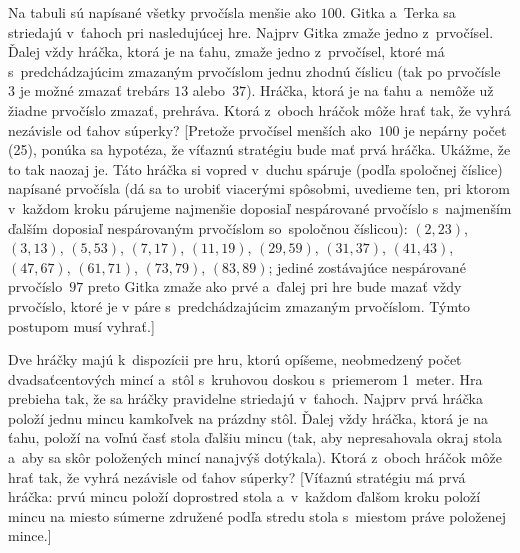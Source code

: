 {Na tabuli sú napísané všetky prvočísla menšie ako $100$.
Gitka a~Terka sa striedajú v~ťahoch pri nasledujúcej hre. Najprv
Gitka zmaže jedno z~prvočísel. Ďalej vždy hráčka, ktorá
je na ťahu, zmaže jedno z~prvočísel, ktoré má s~predchádzajúcim
zmazaným prvočíslom jednu zhodnú číslicu (tak po prvočísle~$3$ je možné zmazať
trebárs $13$ alebo~$37$).
Hráčka, ktorá je na ťahu a~nemôže už žiadne prvočíslo zmazať,
prehráva. Ktorá z~oboch hráčok môže hrať tak, že
vyhrá nezávisle od ťahov súperky? [Pretože prvočísel
menších ako~$100$ je nepárny počet (25), ponúka sa hypotéza, že
víťaznú stratégiu bude mať prvá hráčka. Ukážme, že to tak
naozaj je. Táto hráčka si vopred v~duchu spáruje (podľa spoločnej
číslice) napísané prvočísla
(dá sa to urobiť viacerými spôsobmi, uvedieme ten, pri ktorom v~každom kroku
párujeme najmenšie doposiaľ nespárované prvočíslo s~najmenším ďalším
doposiaľ nespárovaným prvočíslom so~spoločnou číslicou):
$(2,23)$, $(3,13)$, $(5,53)$,
$(7,17)$, $(11,19)$, $(29,59)$, $(31,37)$, $(41,43)$, $(47,67)$,
$(61,71)$, $(73,79)$, $(83,89)$; jediné zostávajúce nespárované
prvočíslo~$97$ preto Gitka zmaže ako prvé a~ďalej pri hre
bude mazať vždy prvočíslo, ktoré je v páre
s~predchádzajúcim zmazaným prvočíslom. Týmto postupom musí vyhrať.]

Dve hráčky majú k~dispozícii pre hru, ktorú opíšeme,
neobmedzený počet dvadsaťcentových mincí a~stôl s~kruhovou doskou s~priemerom 1~meter.
Hra prebieha tak, že sa hráčky pravidelne striedajú v~ťahoch.
Najprv prvá hráčka položí jednu mincu kamkoľvek na prázdny stôl.
Ďalej vždy hráčka, ktorá je na ťahu,
položí na voľnú časť stola ďalšiu mincu (tak, aby nepresahovala
okraj stola a~aby sa skôr položených mincí nanajvýš dotýkala).
Ktorá z~oboch hráčok môže hrať tak, že vyhrá nezávisle
od ťahov súperky? [Víťaznú stratégiu má prvá hráčka:
prvú mincu položí doprostred stola
a~v~každom ďalšom kroku položí mincu na miesto súmerne združené
podľa stredu stola s~miestom práve položenej mince.]
}

